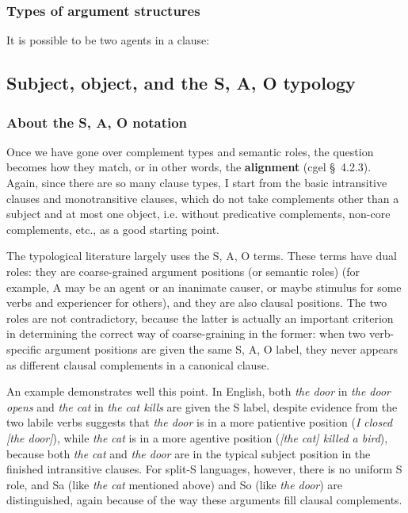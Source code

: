 \documentclass{article}
\newcommand*{\citesec}[1]{\S~{#1}}
\newcommand*{\concept}[1]{\textbf{#1}}
\newcommand*{\corpus}[1]{\emph{#1}}
\begin{document}

\subsubsection{Types of argument structures}

It is possible to be two agents in a clause: 

\subsection{Subject, object, and the S, A, O typology}\label{sec:sao-typology}

\subsubsection{About the S, A, O notation}

Once we have gone over complement types and semantic roles,
the question becomes how they match, or in other words, the \concept{alignment}
(\ac{cgel} \citesec{4.2.3}).
Again, since there are so many clause types, 
I start from the basic intransitive clauses and monotransitive clauses,
which do not take complements other than a subject and at most one object, 
i.e. without predicative complements, 
non-core complements, etc.,
as a good starting point.

The typological literature largely uses the S, A, O terms.
These terms have dual roles:
they are coarse-grained argument positions (or semantic roles)
(for example, A may be an agent or an inanimate causer, 
or maybe stimulus for some verbs and experiencer for others),
and they are also clausal positions.
The two roles are not contradictory, 
because the latter is actually an important criterion 
in determining the correct way of coarse-graining in the former:
when two verb-specific argument positions are given the same S, A, O label,
they never appears as different clausal complements in a canonical clause.

An example demonstrates well this point.
In English, both \corpus{the door} in \corpus{the door opens}
and \corpus{the cat} in \corpus{the cat kills} 
are given the S label,
despite evidence from the two labile verbs suggests that 
\corpus{the door} is in a more patientive position (\corpus{I closed [the door]}), 
while \corpus{the cat} is in a more agentive position (\corpus{[the cat] killed a bird}),
because both \corpus{the cat} and \corpus{the door} are in the typical subject position 
in the finished intransitive clauses.
For split-S languages, however, there is no uniform S role,
and Sa (like \corpus{the cat} mentioned above)
and So (like \corpus{the door})
are distinguished, 
again because of the way these arguments fill clausal complements.
\end{document}

